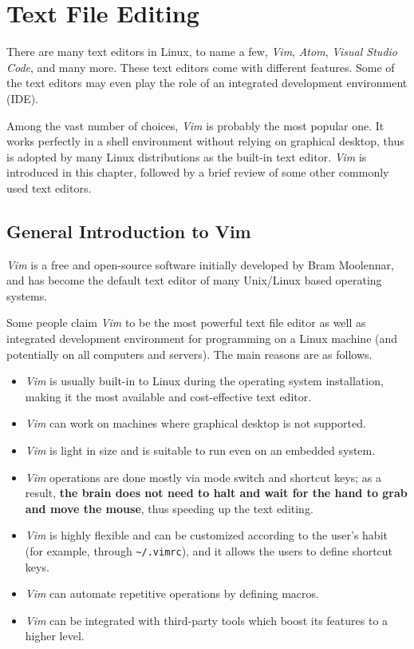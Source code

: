 \chapter{Text File Editing} \label{ch:tfe}

There are many text editors in Linux, to name a few, \textit{Vim}, \textit{Atom}, \textit{Visual Studio Code}, and many more. These text editors come with different features. Some of the text editors may even play the role of an integrated development environment (IDE).

Among the vast number of choices, \textit{Vim} is probably the most popular one. It works perfectly in a shell environment without relying on graphical desktop, thus is adopted by many Linux distributions as the built-in text editor. \textit{Vim} is introduced in this chapter, followed by a brief review of some other commonly used text editors.

\section{General Introduction to Vim}

\textit{Vim} is a free and open-source software initially developed by Bram Moolennar, and has become the default text editor of many Unix/Linux based operating systems.

Some people claim \textit{Vim} to be the most powerful text file editor as well as integrated development environment for programming on a Linux machine (and potentially on all computers and servers). The main reasons are as follows.
\begin{itemize}
  \item \textit{Vim} is usually built-in to Linux during the operating system installation, making it the most available and cost-effective text editor.
  \item \textit{Vim} can work on machines where graphical desktop is not supported.
  \item \textit{Vim} is light in size and is suitable to run even on an embedded system.
  \item \textit{Vim} operations are done mostly via mode switch and shortcut keys; as a result, \textbf{the brain does not need to halt and wait for the hand to grab and move the mouse}, thus speeding up the text editing.
  \item \textit{Vim} is highly flexible and can be customized according to the user's habit (for example, through \verb|~/.vimrc|), and it allows the users to define shortcut keys.
  \item \textit{Vim} can automate repetitive operations by defining macros.
  \item \textit{Vim} can be integrated with third-party tools which boost its features to a higher level.
\end{itemize}

